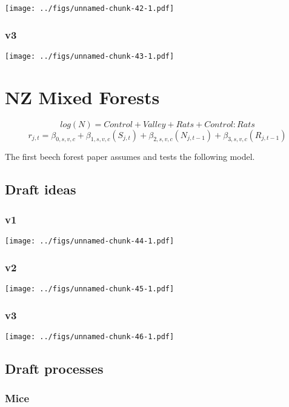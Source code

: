 \documentclass[]{book}
\begin{document}
\texttt{[image: ../figs/unnamed-chunk-42-1.pdf]}

\hypertarget{v3-2}{%
\subsection{v3}\label{v3-2}}

\texttt{[image: ../figs/unnamed-chunk-43-1.pdf]}

\hypertarget{mpd}{%
\chapter{NZ Mixed Forests}\label{mpd}}

\[log(N) = Control + Valley + Rats + Control:Rats\]
\[r_{j,t} = \beta_{0,s,v,c} + \beta_{1,s,v,c} (S_{j,t})+ \beta_{2,s,v,c} (N_{j,t-1}) + \beta_{3,s,v,c} (R_{j,t-1})\]

The first beech forest paper assumes and tests the following model.

\hypertarget{draft-ideas-1}{%
\section{Draft ideas}\label{draft-ideas-1}}

\hypertarget{v1-3}{%
\subsection{v1}\label{v1-3}}

\texttt{[image: ../figs/unnamed-chunk-44-1.pdf]}

\hypertarget{v2-3}{%
\subsection{v2}\label{v2-3}}

\texttt{[image: ../figs/unnamed-chunk-45-1.pdf]}

\hypertarget{v3-3}{%
\subsection{v3}\label{v3-3}}

\texttt{[image: ../figs/unnamed-chunk-46-1.pdf]}

\hypertarget{draft-processes}{%
\section{Draft processes}\label{draft-processes}}

\hypertarget{mice}{%
\subsection{Mice}\label{mice}}
\end{document}
